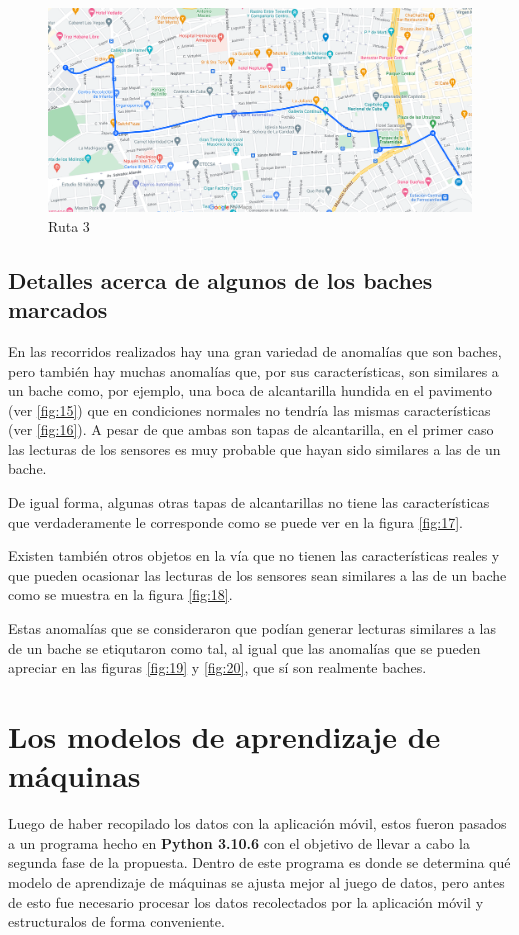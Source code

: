 	\begin{figure}[htb]
		\centering
		\includegraphics[scale = 0.4]{Graphics/route_3_EgidoArsenal_LyJovellarHotelColina.png}
		\caption{Ruta 3}
		\label{fig:12}
	\end{figure}

	\subsection{Detalles acerca de algunos de los baches marcados}
		En las recorridos realizados hay una gran variedad de anomalías que son baches, pero también hay muchas anomalías que, por sus características,
		son similares a un bache como, por ejemplo, una boca de alcantarilla hundida en el pavimento (ver \ref{fig:15}) que en condiciones normales no 
		tendría las mismas características (ver \ref{fig:16}). A pesar de que ambas son tapas de alcantarilla, en el primer caso las lecturas de los 
		sensores es muy probable que hayan sido similares a las de un bache.

		De igual forma, algunas otras tapas de alcantarillas no tiene las características que verdaderamente le corresponde como se puede ver en la
		figura \ref{fig:17}.

		Existen también otros objetos en la vía que no tienen las características reales y que pueden ocasionar las lecturas de los sensores sean similares
		a las de un bache como se muestra en la figura \ref{fig:18}.

		Estas anomalías que se consideraron que podían generar lecturas	similares a las de un bache se etiqutaron como tal, al igual que las anomalías que se 
		pueden apreciar en las figuras \ref{fig:19} y \ref{fig:20}, que sí son realmente baches.

\section{Los modelos de aprendizaje de máquinas}
	Luego de haber recopilado los datos con la aplicación móvil, estos fueron pasados a un programa hecho en \textbf{Python 3.10.6} con el objetivo
	de llevar a cabo la segunda fase de la propuesta. Dentro de este programa es donde se determina qué modelo de aprendizaje de máquinas se ajusta
	mejor al juego de datos, pero antes de esto fue necesario procesar los datos recolectados por la aplicación móvil y estructuralos de forma conveniente. 

